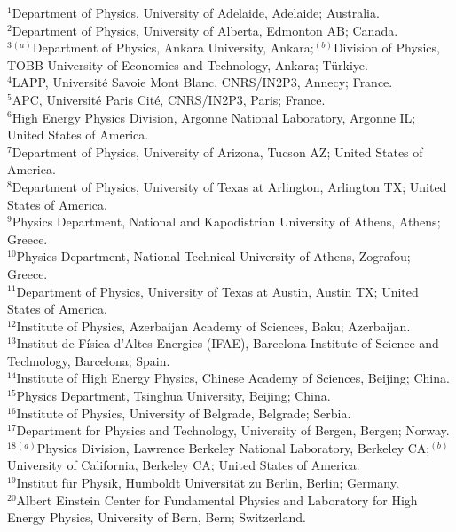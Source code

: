 \documentclass[PAPER, atlasdraft=false, USenglish, cernpreprint]{atlasdoc}
\begin{document}
\begin{flushleft}
$^{1}$Department of Physics, University of Adelaide, Adelaide; Australia.\\
$^{2}$Department of Physics, University of Alberta, Edmonton AB; Canada.\\
$^{3}$$^{(a)}$Department of Physics, Ankara University, Ankara;$^{(b)}$Division of Physics, TOBB University of Economics and Technology, Ankara; T\"urkiye.\\
$^{4}$LAPP, Université Savoie Mont Blanc, CNRS/IN2P3, Annecy; France.\\
$^{5}$APC, Universit\'e Paris Cit\'e, CNRS/IN2P3, Paris; France.\\
$^{6}$High Energy Physics Division, Argonne National Laboratory, Argonne IL; United States of America.\\
$^{7}$Department of Physics, University of Arizona, Tucson AZ; United States of America.\\
$^{8}$Department of Physics, University of Texas at Arlington, Arlington TX; United States of America.\\
$^{9}$Physics Department, National and Kapodistrian University of Athens, Athens; Greece.\\
$^{10}$Physics Department, National Technical University of Athens, Zografou; Greece.\\
$^{11}$Department of Physics, University of Texas at Austin, Austin TX; United States of America.\\
$^{12}$Institute of Physics, Azerbaijan Academy of Sciences, Baku; Azerbaijan.\\
$^{13}$Institut de F\'isica d'Altes Energies (IFAE), Barcelona Institute of Science and Technology, Barcelona; Spain.\\
$^{14}$Institute of High Energy Physics, Chinese Academy of Sciences, Beijing; China.\\
$^{15}$Physics Department, Tsinghua University, Beijing; China.\\
$^{16}$Institute of Physics, University of Belgrade, Belgrade; Serbia.\\
$^{17}$Department for Physics and Technology, University of Bergen, Bergen; Norway.\\
$^{18}$$^{(a)}$Physics Division, Lawrence Berkeley National Laboratory, Berkeley CA;$^{(b)}$University of California, Berkeley CA; United States of America.\\
$^{19}$Institut f\"{u}r Physik, Humboldt Universit\"{a}t zu Berlin, Berlin; Germany.\\
$^{20}$Albert Einstein Center for Fundamental Physics and Laboratory for High Energy Physics, University of Bern, Bern; Switzerland.\\

\end{flushleft}
\end{document}
